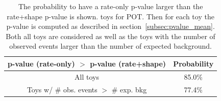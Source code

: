 %


\begin{table}
\centering
\begin{tabular}{| c | c |}
\hline
p-value (rate-only) $>$ p-value (rate+shape)		& Probability          	\\
\hline
All toys									& 85.0\%									\\
Toys w/ \# obs. events $>$ \# exp. bkg 			& 77.4\%									\\
\hline
\end{tabular}
\caption{
The probability to have a rate-only p-value larger than the rate+shape p-value is shown.
\NumToysLarge toys for 
\TotalPot POT.
Then for each toy the p-value is computed as described in section~\ref{subsec:pvalue_mean}.
Both all toys are considered as well as the toys with the number of observed events larger
than the number of expected background.
}
\label{tab:pvalue_mean_rate_large_shape_lowpot}
\end{table}



